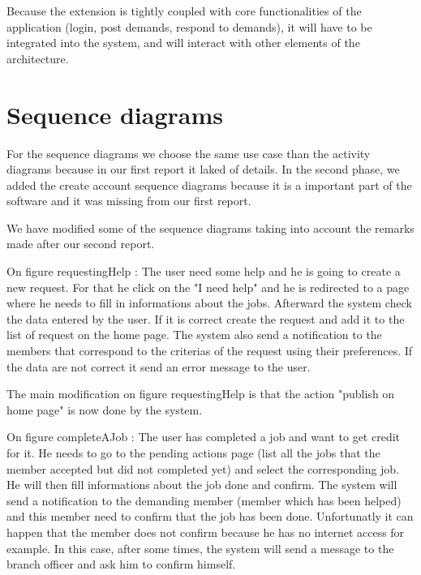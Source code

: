 \documentclass[11pt, a4paper]{article}   	%
\begin{document}
\medskip
Because the extension is tightly coupled with core functionalities of the application (login, post demands, respond to demands), it will have to be integrated into the system, and will interact with other elements of the architecture.




\section{Sequence diagrams}

For the sequence diagrams we choose the same use case than the activity diagrams because in our first report it laked of details.
In the second phase, we added the create account sequence diagrams because it is a important part of the software and it was missing from our first report.

We have modified some of the sequence diagrams taking into account the remarks made after our second report.


On figure {requestingHelp} : The user need some help and he is going to create a new request. For that he click on the "I need help"
and he is redirected to a page where he needs to fill in informations about the jobs. Afterward the system check the data entered by the user.
If it is correct create the request and add it to the list of request on the home page. The system also send a notification to the members that
correspond to the criterias of the request using their preferences. If the data are not correct it send an error message to the user.

The main modification on figure {requestingHelp} is that the action "publish on home page" is now done by the system.


On figure {completeAJob} : The user has completed a job and want to get credit for it. He needs to go to the pending actions page (list all the jobs that the member accepted but did not completed yet) and select the corresponding job. He will then fill informations about the job done and confirm. 
The system will send a notification to the demanding member (member which has been helped) and this member need to confirm that the job has been done.
Unfortunatly it can happen that the member does not confirm because he has no internet access for example. In this case, after some times, the system will send a message to the branch officer and ask him to confirm himself.
\end{document}
